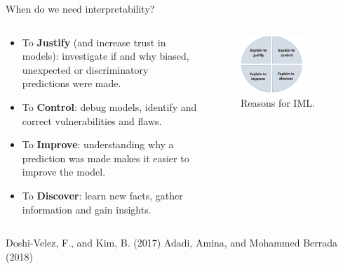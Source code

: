 \documentclass[11pt,compress,t,notes=noshow, xcolor=table]{beamer}
\begin{document}
\begin{vbframe}{When do we need interpretability?}
\begin{columns}
\begin{column}{0.6\textwidth}
\begin{itemize}
  \item To \textbf{Justify} (and increase trust in models): investigate if and why biased, unexpected or discriminatory predictions were made.
  \item To \textbf{Control}: debug models, identify and correct vulnerabilities and flaws.
  \item To \textbf{Improve}: understanding why a prediction was made makes it easier to improve the model.
  \item To \textbf{Discover}: learn new facts, gather information and gain insights.
\end{itemize}
\end{column}
\begin{column}{0.6\textwidth}  %
 \vspace{0.5cm}
 \begin{center}
 \begin{figure}
  \includegraphics[width=0.7\textwidth]{figure_man/explain-to}
  \caption{Reasons for IML.}
 \end{figure}
 \end{center}
\end{column}
\end{columns}
 \lz
\tiny{Doshi-Velez, F., and Kim, B. (2017)}
\tiny{Adadi, Amina, and Mohammed Berrada (2018)}
\end{vbframe}


\endlecture
\end{document}
